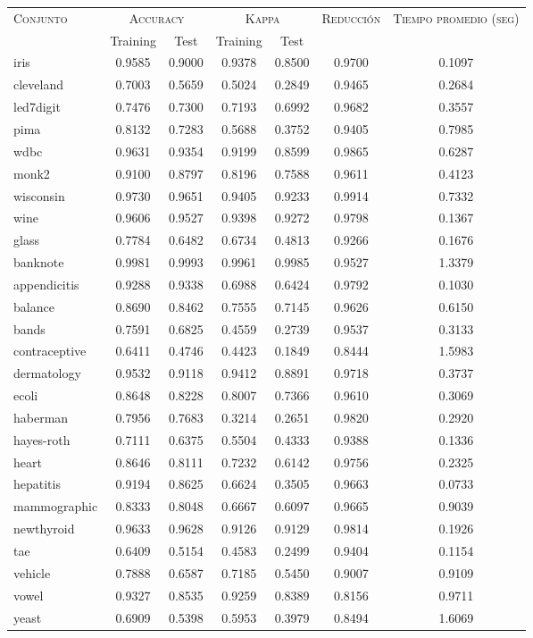 \begin{table}[]
\centering
\begin{tabular}{l c c c c c c}
\hline
\multirow{2}{*}{\textsc{Conjunto}}
	& \multicolumn{2}{c}{\textsc{Accuracy}}
	& \multicolumn{2}{c}{\textsc{Kappa}}
	& \textsc{Reducción}
	& \textsc{Tiempo promedio (seg)} \\
	& Training & Test
	& Training & Test \\ 
\hline
\hline

iris & 0.9585 & 0.9000 & 0.9378 & 0.8500 & 0.9700 & 0.1097 \\
cleveland & 0.7003 & 0.5659 & 0.5024 & 0.2849 & 0.9465 & 0.2684 \\
led7digit & 0.7476 & 0.7300 & 0.7193 & 0.6992 & 0.9682 & 0.3557 \\
pima & 0.8132 & 0.7283 & 0.5688 & 0.3752 & 0.9405 & 0.7985 \\
wdbc & 0.9631 & 0.9354 & 0.9199 & 0.8599 & 0.9865 & 0.6287 \\
monk2 & 0.9100 & 0.8797 & 0.8196 & 0.7588 & 0.9611 & 0.4123 \\
wisconsin & 0.9730 & 0.9651 & 0.9405 & 0.9233 & 0.9914 & 0.7332 \\
wine & 0.9606 & 0.9527 & 0.9398 & 0.9272 & 0.9798 & 0.1367 \\
glass & 0.7784 & 0.6482 & 0.6734 & 0.4813 & 0.9266 & 0.1676 \\
banknote & 0.9981 & 0.9993 & 0.9961 & 0.9985 & 0.9527 & 1.3379 \\
appendicitis & 0.9288 & 0.9338 & 0.6988 & 0.6424 & 0.9792 & 0.1030 \\
balance & 0.8690 & 0.8462 & 0.7555 & 0.7145 & 0.9626 & 0.6150 \\
bands & 0.7591 & 0.6825 & 0.4559 & 0.2739 & 0.9537 & 0.3133 \\
contraceptive & 0.6411 & 0.4746 & 0.4423 & 0.1849 & 0.8444 & 1.5983 \\
dermatology & 0.9532 & 0.9118 & 0.9412 & 0.8891 & 0.9718 & 0.3737 \\
ecoli & 0.8648 & 0.8228 & 0.8007 & 0.7366 & 0.9610 & 0.3069 \\
haberman & 0.7956 & 0.7683 & 0.3214 & 0.2651 & 0.9820 & 0.2920 \\
hayes-roth & 0.7111 & 0.6375 & 0.5504 & 0.4333 & 0.9388 & 0.1336 \\
heart & 0.8646 & 0.8111 & 0.7232 & 0.6142 & 0.9756 & 0.2325 \\
hepatitis & 0.9194 & 0.8625 & 0.6624 & 0.3505 & 0.9663 & 0.0733 \\
mammographic & 0.8333 & 0.8048 & 0.6667 & 0.6097 & 0.9665 & 0.9039 \\
newthyroid & 0.9633 & 0.9628 & 0.9126 & 0.9129 & 0.9814 & 0.1926 \\
tae & 0.6409 & 0.5154 & 0.4583 & 0.2499 & 0.9404 & 0.1154 \\
vehicle & 0.7888 & 0.6587 & 0.7185 & 0.5450 & 0.9007 & 0.9109 \\
vowel & 0.9327 & 0.8535 & 0.9259 & 0.8389 & 0.8156 & 0.9711 \\
yeast & 0.6909 & 0.5398 & 0.5953 & 0.3979 & 0.8494 & 1.6069 \\


\end{tabular}
\end{table}
